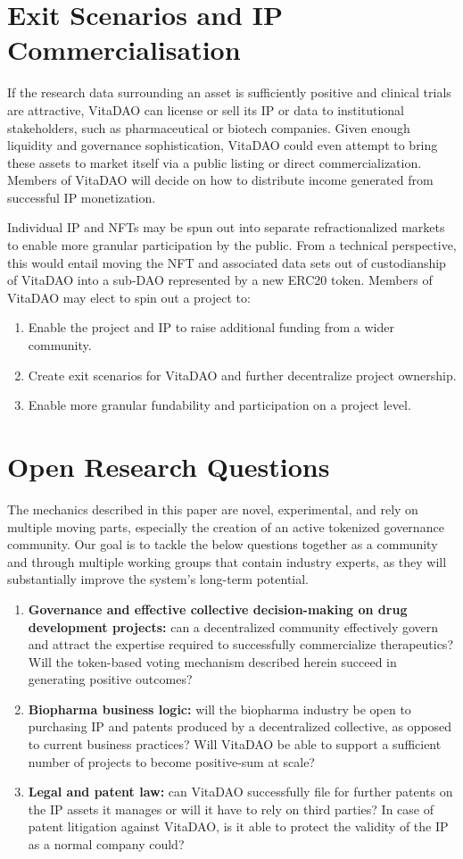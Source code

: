 \documentclass[12pt,letterpaper]{article}
\begin{document}
\section{Exit Scenarios and IP Commercialisation}
If the research data surrounding an asset is sufficiently positive and clinical trials are attractive, VitaDAO can license or sell its IP or data to institutional stakeholders, such as pharmaceutical or biotech companies. Given enough liquidity and governance sophistication, VitaDAO could even attempt to bring these assets to market itself via a public listing or direct commercialization. Members of VitaDAO will decide on how to distribute income generated from successful IP monetization.

Individual IP and NFTs may be spun out into separate refractionalized markets to enable more granular participation by the public. From a technical perspective, this would entail moving the NFT and associated data sets out of custodianship of VitaDAO into a sub-DAO represented by a new ERC20 token. Members of VitaDAO may elect to spin out a project to:
\begin{enumerate}
\item Enable the project and IP to raise additional funding from a wider community.
\item Create exit scenarios for VitaDAO and further decentralize project ownership.
\item Enable more granular fundability and participation on a project level.
\end{enumerate}

\section{Open Research Questions}
The mechanics described in this paper are novel, experimental, and rely on multiple moving parts, especially the creation of an active tokenized governance community. Our goal is to tackle the below questions together as a community and through multiple working groups that contain industry experts, as they will substantially improve the system’s long-term potential.
\begin{enumerate}
\item \textbf{Governance and effective collective decision-making on drug development projects:} can a decentralized community effectively govern and attract the expertise required to successfully commercialize therapeutics? Will the token-based voting mechanism described herein succeed in generating positive outcomes?
\item \textbf{Biopharma business logic:} will the biopharma industry be open to purchasing IP and patents produced by a decentralized collective, as opposed to current business practices? Will VitaDAO be able to support a sufficient number of projects to become positive-sum at scale?
\item \textbf{Legal and patent law:} can VitaDAO successfully file for further patents on the IP assets it manages or will it have to rely on third parties? In case of patent litigation against VitaDAO, is it able to protect the validity of the IP as a normal company could?
\end{enumerate}
\end{document}
